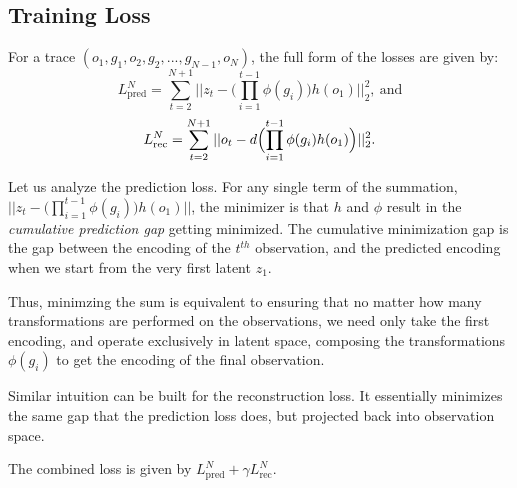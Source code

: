 \documentclass[10pt]{article} %
\begin{document}
 \subsection{Training Loss}
 \label{sec:training_loss}
 For a trace $(o_1, g_1, o_2, g_2, ..., g_{N-1}, o_N)$, the full form of the losses are given by:
 \[ 
 L_{\text{pred}}^N = \sum_{t = 2}^{N+1} ||z_{t} - \bigl ( \prod_{i = 1}^{t-1} \phi(g_i)  \bigr)h(o_1)||_2^2
 ,~\text{and}\]
 \[ 
   L_{\text{rec}}^N = \sum_{t = 2}^{N+1} ||o_t - d\Bigl ( \prod_{i = 1}^{t-1} \phi(g_i)  h(o_1)\Bigr )||_2^2
 .\]

 Let us analyze the prediction loss. For any single term of the summation, $||z_{t} - \bigl ( \prod_{i = 1}^{t-1} \phi(g_i)  \bigr)h(o_1)||$, the minimizer is that $h$ and $\phi$ result in the \textit{cumulative prediction gap} getting minimized. The cumulative minimization gap is the gap between the encoding of the $t^{th}$ observation, and the predicted encoding when we start from the very first latent $z_1$.

 Thus, minimzing the sum is equivalent to ensuring that no matter how many transformations are performed on the observations, we need only take the first encoding, and operate exclusively in latent space, composing the transformations $\phi(g_i)$ to get the encoding of the final observation.

 Similar intuition can be built for the reconstruction loss. It essentially minimizes the same gap that the prediction loss does, but projected back into observation space.

 The combined loss is given by $L_{\text{pred}}^N + \gamma L_{\text{rec}}^N$.
\end{document}
